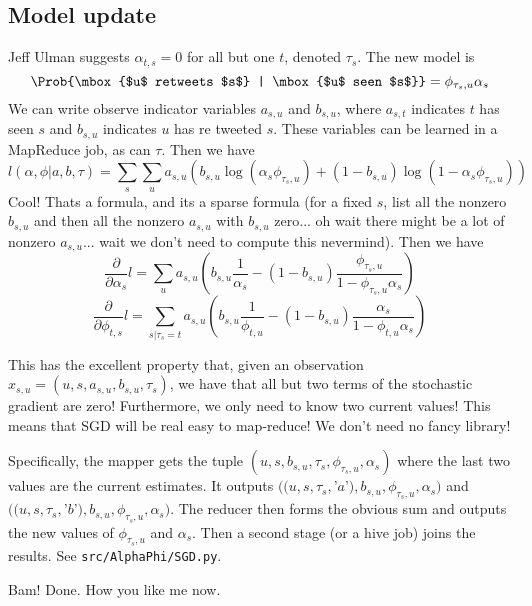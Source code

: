 \subsection*{Model update}

Jeff Ulman suggests $\alpha_{t,s}=0$ for all but one $t$, denoted $\tau_s$.
The new model is
\[\Prob{\mbox{$u$ retweets $s$} | \mbox{$u$ seen $s$}} = \phi_{\tau_s,u}\alpha_{s}\]
We can write observe indicator variables $a_{s,u}$ and $b_{s,u}$, where $a_{s,t}$ indicates $t$ has seen $s$ and $b_{s,u}$ indicates $u$ has re tweeted $s$.
These variables can be learned in a MapReduce job, as can $\tau$.  
Then we have
\[l(\alpha,\phi | a,b,\tau) = \sum_s \sum_u a_{s,u}\left(b_{s,u}\log(\alpha_{s}\phi_{\tau_s,u}) + (1-b_{s,u})\log(1-\alpha_{s}\phi_{\tau_s,u})\right)\]
Cool!  Thats a formula, and its a sparse formula (for a fixed $s$, list all the nonzero $b_{s,u}$ and then all the nonzero $a_{s,u}$ with $b_{s,u}$ zero... oh wait there might be a lot of nonzero $a_{s,u}$... wait we don't need to compute this nevermind).  
Then we have
\[\frac{\partial}{\partial \alpha_s}l = \sum_u a_{s,u}\left(b_{s,u}\frac{1}{\alpha_s} - (1-b_{s,u})\frac{\phi_{\tau_s,u}}{1-\phi_{\tau_s,u}\alpha_s}\right)\]
\[\frac{\partial}{\partial \phi_{t,s}}l = \sum_{s|\tau_s=t} a_{s,u}\left(b_{s,u}\frac{1}{\phi_{t,u}} - (1-b_{s,u})\frac{\alpha_s}{1-\phi_{t,u}\alpha_s}\right)\]

This has the excellent property that, given an observation $x_{s,u} = (u,s,a_{s,u},b_{s,u},\tau_s)$, we have that all but two terms of the stochastic gradient are zero!  Furthermore, we only need to know two current values!
This means that SGD will be real easy to map-reduce!  We don't need no fancy library! 

Specifically, the mapper gets the tuple $(u,s,b_{s,u},\tau_s,\phi_{\tau_s,u},\alpha_s)$ where the last two values are the current estimates.
It outputs $((u,s,\tau_s,$'$a$'$),b_{s,u},\phi_{\tau_s,u},\alpha_s)$ and $((u,s,\tau_s,$'$b$'$),b_{s,u},\phi_{\tau_s,u},\alpha_s)$.
The reducer then forms the obvious sum and outputs the new values of $\phi_{\tau_s,u}$ and $\alpha_s$.
Then a second stage (or a hive job) joins the results.  See \texttt{src/AlphaPhi/SGD.py}.  

Bam!  Done.  How you like me now.  
